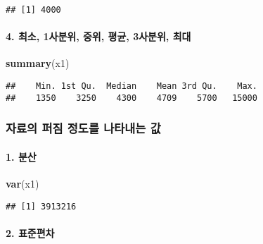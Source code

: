 \documentclass[
]{article}
\newenvironment{Shaded}{\begin{snugshade}}{\end{snugshade}}
\newcommand{\FunctionTok}[1]{\textcolor[rgb]{0.13,0.29,0.53}{\textbf{#1}}}
\newcommand{\NormalTok}[1]{#1}
\begin{document}
\begin{verbatim}
## [1] 4000
\end{verbatim}

\hypertarget{uxcd5cuxc18c-1uxc0acuxbd84uxc704-uxc911uxc704-uxd3c9uxade0-3uxc0acuxbd84uxc704-uxcd5cuxb300}{%
\paragraph{4. 최소, 1사분위, 중위, 평균, 3사분위,
최대}\label{uxcd5cuxc18c-1uxc0acuxbd84uxc704-uxc911uxc704-uxd3c9uxade0-3uxc0acuxbd84uxc704-uxcd5cuxb300}}

\begin{Shaded}
\begin{Highlighting}[]
\FunctionTok{summary}\NormalTok{(x1)}
\end{Highlighting}
\end{Shaded}

\begin{verbatim}
##    Min. 1st Qu.  Median    Mean 3rd Qu.    Max. 
##    1350    3250    4300    4709    5700   15000
\end{verbatim}

\hypertarget{uxc790uxb8ccuxc758-uxd37cuxc9d0-uxc815uxb3c4uxb97c-uxb098uxd0c0uxb0b4uxb294-uxac12}{%
\subsubsection{자료의 퍼짐 정도를 나타내는
값}\label{uxc790uxb8ccuxc758-uxd37cuxc9d0-uxc815uxb3c4uxb97c-uxb098uxd0c0uxb0b4uxb294-uxac12}}

\hypertarget{uxbd84uxc0b0}{%
\paragraph{1. 분산}\label{uxbd84uxc0b0}}

\begin{Shaded}
\begin{Highlighting}[]
\FunctionTok{var}\NormalTok{(x1)}
\end{Highlighting}
\end{Shaded}

\begin{verbatim}
## [1] 3913216
\end{verbatim}

\hypertarget{uxd45cuxc900uxd3b8uxcc28}{%
\paragraph{2. 표준편차}\label{uxd45cuxc900uxd3b8uxcc28}}
\end{document}
